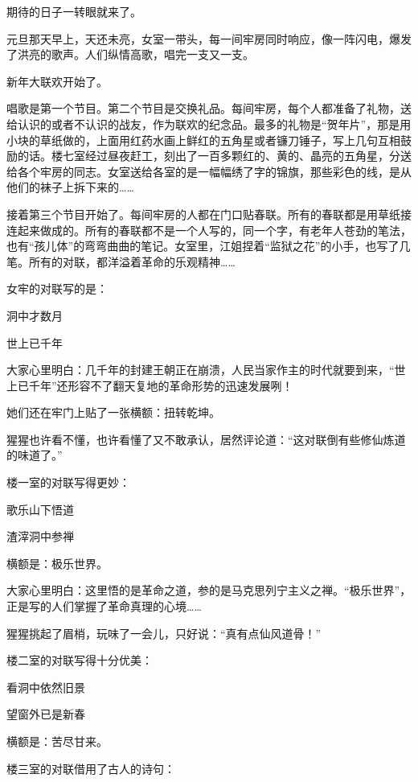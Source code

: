 \documentclass[12pt,UTF-8,openany]{ctexbook}
\begin{document}
\begin{large}
    
    期待的日子一转眼就来了。
    
    元旦那天早上，天还未亮，女室一带头，每一间牢房同时响应，像一阵闪电，爆发了洪亮的歌声。人们纵情高歌，唱完一支又一支。
    
    新年大联欢开始了。
    
    唱歌是第一个节目。第二个节目是交换礼品。每间牢房，每个人都准备了礼物，送给认识的或者不认识的战友，作为联欢的纪念品。最多的礼物是“贺年片”，那是用小块的草纸做的，上面用红药水画上鲜红的五角星或者镰刀锤子，写上几句互相鼓励的话。楼七室经过昼夜赶工，刻出了一百多颗红的、黄的、晶亮的五角星，分送给各个牢房的同志。女室送给各室的是一幅幅绣了字的锦旗，那些彩色的线，是从他们的袜子上拆下来的……
    
    接着第三个节目开始了。每间牢房的人都在门口贴春联。所有的春联都是用草纸接连起来做成的。所有的春联都不是一个人写的，同一个字，有老年人苍劲的笔法，也有“孩儿体”的弯弯曲曲的笔记。女室里，江姐捏着“监狱之花”的小手，也写了几笔。所有的对联，都洋溢着革命的乐观精神……
    
    女牢的对联写的是：
    
    洞中才数月
    
    世上已千年
    
    大家心里明白：几千年的封建王朝正在崩溃，人民当家作主的时代就要到来，“世上已千年”还形容不了翻天复地的革命形势的迅速发展咧！
    
    她们还在牢门上贴了一张横额：扭转乾坤。
    
    猩猩也许看不懂，也许看懂了又不敢承认，居然评论道：“这对联倒有些修仙炼道的味道了。”
    
    楼一室的对联写得更妙：
    
    歌乐山下悟道
    
    渣滓洞中参禅
    
    横额是：极乐世界。
    
    大家心里明白：这里悟的是革命之道，参的是马克思列宁主义之禅。“极乐世界”，正是写的人们掌握了革命真理的心境……
    
    猩猩挑起了眉梢，玩味了一会儿，只好说：“真有点仙风道骨！”
    
    楼二室的对联写得十分优美：
    
    看洞中依然旧景
    
    望窗外已是新春
    
    横额是：苦尽甘来。
    
    楼三室的对联借用了古人的诗句：
    

\end{large}
\end{document}
